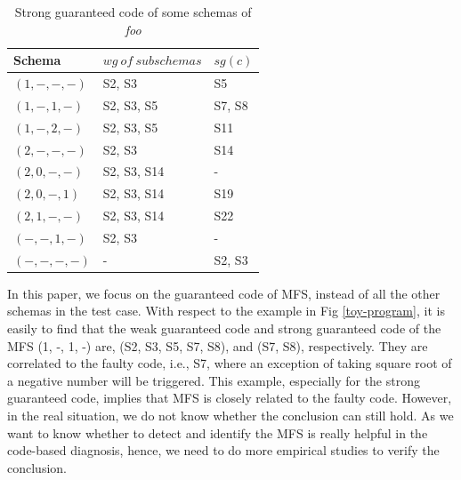 \documentclass{sig-alternate-05-2015}
\begin{document}
\begin{table}[ht]
\caption{Strong guaranteed code of some schemas of \emph{foo}}
\label{strong-foo}
\center
\begin{tabular}{lll}
 \hline
\bfseries Schema & \bfseries $wg\ of\ subschemas$ & \bfseries $sg(c)$\\  \hline
 $(1, -, -, -)$ & S2, S3 & S5 \\
 $(1, -, 1, -)$ & S2, S3, S5 & S7, S8\\
 $(1, -, 2, -)$ & S2, S3, S5 & S11\\
 $(2, -, -, -)$ & S2, S3 &  S14\\
 $(2, 0, -, -)$ & S2, S3, S14 &  - \\
 $(2, 0, -, 1)$ & S2, S3, S14 & S19\\
 $(2, 1, -, -)$ & S2, S3, S14 & S22\\
 $(-, -, 1, -)$ & S2, S3 & - \\
 $(-, -, -, -)$ & - & S2, S3 \\
 \hline
\end{tabular}
\end{table}


In this paper, we focus on the guaranteed code of MFS, instead of all the other schemas in the test case. With respect to the example in Fig \ref{toy-program}, it is easily to find that the weak guaranteed code and strong guaranteed code of the MFS (1, -, 1, -) are, (S2, S3, S5, S7, S8), and (S7, S8),  respectively. They are correlated to the faulty code, i.e., S7, where an exception of taking square root of a negative number will be triggered. This example, especially for the strong guaranteed code, implies that MFS is closely related to the faulty code.  However, in the real situation, we do not know whether the conclusion can still hold. As we want to know whether to detect and identify the MFS is really helpful in the code-based diagnosis, hence, we need to do more empirical studies to verify the conclusion.


%
%
%

%
\end{document}
